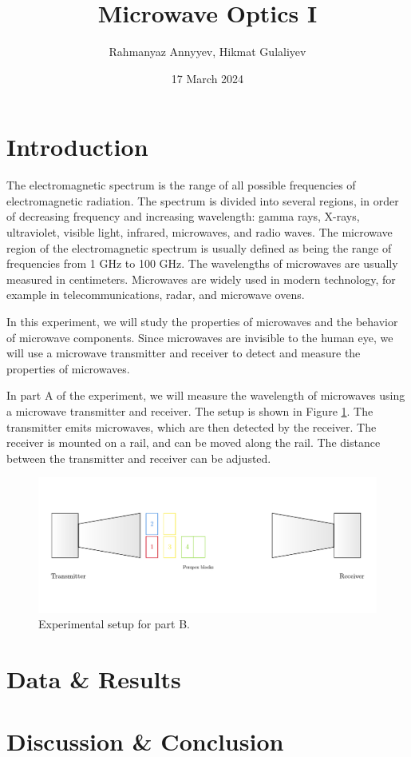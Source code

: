 \documentclass[10pt]{article}
\title{Microwave Optics I}
\author{Rahmanyaz Annyyev, Hikmat Gulaliyev}
\date{17 March 2024}
\begin{document}
\maketitle

\begin{abstract}



\end{abstract}

\section{Introduction}

The electromagnetic spectrum is the range of all possible frequencies of electromagnetic radiation. The spectrum is divided into several regions, in order of decreasing frequency and increasing wavelength: gamma rays, X-rays, ultraviolet, visible light, infrared, microwaves, and radio waves. The microwave region of the electromagnetic spectrum is usually defined as being the range of frequencies from 1 GHz to 100 GHz. The wavelengths of microwaves are usually measured in centimeters. Microwaves are widely used in modern technology, for example in telecommunications, radar, and microwave ovens.

In this experiment, we will study the properties of microwaves and the behavior of microwave components. Since microwaves are invisible to the human eye, we will use a microwave transmitter and receiver to detect and measure the properties of microwaves. 

In part A of the experiment, we will measure the wavelength of microwaves using a microwave transmitter and receiver. The setup is shown in Figure \ref{fig:1}. The transmitter emits microwaves, which are then detected by the receiver. The receiver is mounted on a rail, and can be moved along the rail. The distance between the transmitter and receiver can be adjusted.

\begin{figure}[ht]
  \centering
  \includegraphics[scale=0.6]{figures/f1.pdf}
  \caption{Experimental setup for part B.}
  \label{fig:1}
\end{figure}

\section{Data \& Results}

\section{Discussion \& Conclusion}

\printbibliography
\end{document}
